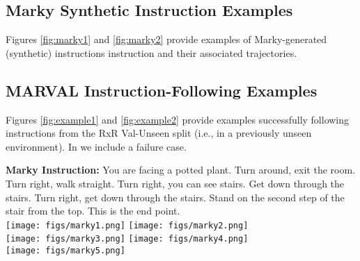 \subsection{Marky Synthetic Instruction Examples}
Figures \ref{fig:marky1} and \ref{fig:marky2} provide examples of Marky-generated (synthetic) instructions instruction and their associated trajectories.


\subsection{MARVAL Instruction-Following Examples}

Figures \ref{fig:example1} and \ref{fig:example2} provide examples \ModelName{} successfully following instructions from the RxR Val-Unseen split (i.e., in a previously unseen environment). In  we include a failure case.




\begin{figure*}[h]
  \centering
  \textbf{Marky Instruction:} You are facing a potted plant. Turn around, exit the room. Turn right, walk straight. Turn right, you can see stairs. Get down through the stairs. Turn right, get down through the stairs. Stand on the second step of the stair from the top. This is the end point.
  \vspace{1mm}\\
  \texttt{[image: figs/marky1.png]}
  \texttt{[image: figs/marky2.png]} \vspace{2mm}\\
  \texttt{[image: figs/marky3.png]}
  \texttt{[image: figs/marky4.png]} \vspace{2mm}\\
  \texttt{[image: figs/marky5.png]}
  \caption{Example Marky (synthetic) instruction for a sampled trajectory. The images are 360\degree{} panoramas rotated so that the direction faced by the agent is the in center. \textcolor{blue}{Blue} dots indicate directions the agent can move in the underlying navigation graph. The correct action at each step is colored in \textcolor{red}{red}. Note that the potted plant mentioned in the instruction is on the countertop. }
  \label{fig:marky1}
\end{figure*}

